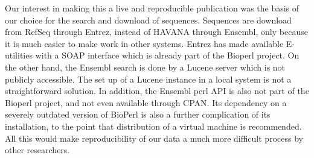   Our interest in making this a live and reproducible publication was the basis of
  our choice for the search and download of sequences. Sequences are download from
  RefSeq through Entrez, instead of HAVANA through Ensembl, only because it is much
  easier to make work in other systems. Entrez has made available E-utilities with
  a SOAP interface which is already part of the Bioperl project.
  On the other hand, the Ensembl search is done by a Lucene server which is not publicly
  accessible. The set up of a Lucene instance in a local system is not a straightforward
  solution.
  In addition, the Ensembl perl API is also not part of the Bioperl project, and not
  even available through CPAN. Its dependency on a severely outdated version of BioPerl
  is also a further complication of its installation, to the point that distribution of
  a virtual machine is recommended.
  All this would make reproducibility
  of our data a much more difficult process by other researchers.



